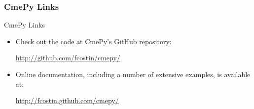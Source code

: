 \documentclass[hyperref={colorlinks=true}]{beamer}
\begin{document}
\begin{frame}
\frametitle{CmePy Links}
\begin{block}{CmePy Links}
\begin{itemize}
\item Check out the code at CmePy's GitHub repository:
\begin{center}
\href{http://github.com/fcostin/cmepy/}{http://github.com/fcostin/cmepy/}
\end{center} 
\item Online documentation, including a number of extensive examples,
is available at:
\begin{center}
\href{http://fcostin.github.com/cmepy/}{http://fcostin.github.com/cmepy/}
\end{center}
\end{itemize}
\end{block}
\end{frame}
\end{document}
